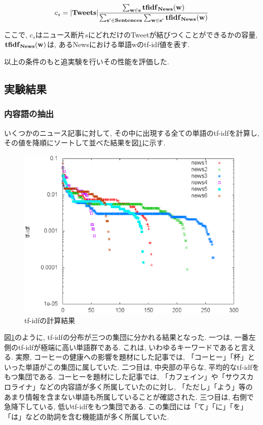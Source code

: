 \documentclass[12pt]{jarticle}
\begin{document}
\begin{equation}
  c_{s} =  |\bf{Tweets}| \frac{\sum _{w \in s} \bf{tfidf}_{News}(w)}{\sum _{s' \in \bf{Sentences}} \sum _{w \in s'} \bf{tfidf}_{News}(w)}
\end{equation}

ここで, $c_s$はニュース断片$s$にどれだけのTweetが結びつくことができるかの容量, $\bf{tfidf}_{News}(w)$は, あるNewsにおける単語wのtf-idf値を表す.

以上の条件のもと追実験を行いその性能を評価した.

\subsection{実験結果}
\subsubsection{内容語の抽出}

いくつかのニュース記事に対して, その中に出現する全ての単語のtf-idfを計算し, その値を降順にソートして並べた結果を図\ref{content_word}に示す.

\begin{figure}[htbp]
  \begin{center}
    \includegraphics[scale = 0.5]{image/content_word.eps}
  \end{center}
  \label{content_word}
  \caption{tf-idfの計算結果}

\end{figure}

図\ref{content_word}のように, tf-idfの分布が三つの集団に分かれる結果となった. 一つは, 一番左側のtf-idfが極端に高い単語群である. これは, いわゆるキーワードであると言える. 実際, コーヒーの健康への影響を題材にした記事では, 「コーヒー」「杯」といった単語がこの集団に属していた. 二つ目は, 中央部の平らな, 平均的なtf-idfをもつ集団である. コーヒーを題材にした記事では, 「カフェイン」や「サウスカロライナ」などの内容語が多く所属していたのに対し, 「ただし」「よう」等のあまり情報を含まない単語も所属していることが確認された. 三つ目は, 右側で急降下している, 低いtf-idfをもつ集団である. この集団には「て」「に」「を」「は」などの助詞を含む機能語が多く所属していた.
\end{document}
